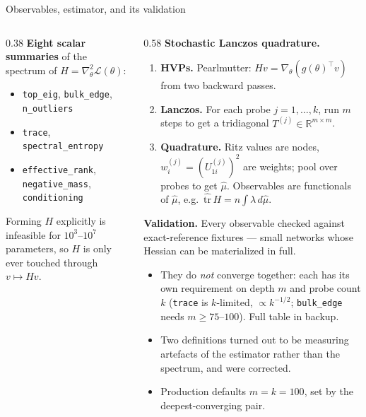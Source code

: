 \documentclass[aspectratio=169,10pt]{beamer}
\newcommand{\R}{\mathbb{R}}
\newcommand{\Loss}{\mathcal{L}}
\begin{document}
\begin{frame}{Observables, estimator, and its validation}
\begin{columns}[T,onlytextwidth]
\begin{column}{0.38\textwidth}
\textbf{Eight scalar summaries} of the spectrum of
$H = \nabla^2_\theta \Loss(\theta)$:
\footnotesize
\vspace{2pt}
\begin{itemize}\setlength\itemsep{0pt}
  \item \texttt{top\_eig}, \texttt{bulk\_edge}, \texttt{n\_outliers}
  \item \texttt{trace}, \texttt{spectral\_entropy}
  \item \texttt{effective\_rank}, \texttt{negative\_mass}, \texttt{conditioning}
\end{itemize}
\vspace{6pt}
Forming $H$ explicitly is infeasible for $10^3$--$10^7$ parameters, so $H$ is
only ever touched through $v \mapsto Hv$.
\end{column}
\begin{column}{0.58\textwidth}\footnotesize
\textbf{Stochastic Lanczos quadrature.}
\begin{enumerate}\setlength\itemsep{1pt}
  \item \textbf{HVPs.} Pearlmutter: $Hv = \nabla_\theta(g(\theta)^\top v)$ from
        two backward passes.
  \item \textbf{Lanczos.} For each probe $j=1,\dots,k$, run $m$ steps to get a
        tridiagonal $T^{(j)} \in \R^{m\times m}$.
  \item \textbf{Quadrature.} Ritz values are nodes,
        $w_i^{(j)} = (U^{(j)}_{1i})^2$ are weights; pool over probes to get
        $\hat\mu$. Observables are functionals of $\hat\mu$, e.g.\
        $\widehat{\mathrm{tr}}\,H = n\!\int\! \lambda \, d\hat\mu$.
\end{enumerate}
\vspace{6pt}
\textbf{Validation.} Every observable checked against exact-reference fixtures
--- small networks whose Hessian can be materialized in full.
\begin{itemize}\setlength\itemsep{1pt}
  \item They do \emph{not} converge together: each has its own requirement on
        depth $m$ and probe count $k$ (\texttt{trace} is $k$-limited,
        $\propto k^{-1/2}$; \texttt{bulk\_edge} needs $m \geq 75$--$100$).
        Full table in backup.
  \item Two definitions turned out to be measuring artefacts of the estimator
        rather than the spectrum, and were corrected.
  \item Production defaults $m = k = 100$, set by the deepest-converging pair.
\end{itemize}
\end{column}
\end{columns}
\end{frame}
\end{document}
